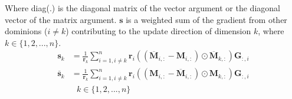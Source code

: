 Where diag(.) is the diagonal matrix of the vector argument or the diagonal vector of the matrix argument. $\mathbf{s}$ is a weighted sum of the gradient from other dominions ($i \neq k$) contributing to the update direction of dimension $k$, where $k \in \{1 , 2 ,...,n\}$.
\begin{equation}
\begin{aligned} 
\mathbf{s}_{k} &= \frac{1}{\mathbf{r}_{k}}\sum_{i=1, i\neq k }^{n}\mathbf{r}_{i}( (\overline{\mathbf{M}}_{i,:} - \mathbf{M}_{i,:})\odot \overline{\mathbf{M}}_{k,:} ) \mathbf{G}_{:,i} \\
\overline{\mathbf{s}}_{k} &= \frac{1}{\mathbf{r}_{k}}\sum_{i=1, i\neq k }^{n}\mathbf{r}_{i}( ( \mathbf{M}_{i,:} - \overline{\mathbf{M}}_{i,:} )\odot \mathbf{M}_{k,:} ) \mathbf{G}_{:,i} \\
&~~~k \in \{1 , 2 ,...,n\}
\label{eq:n-update-grad-selection-sup}
\end{aligned}
\end{equation}


